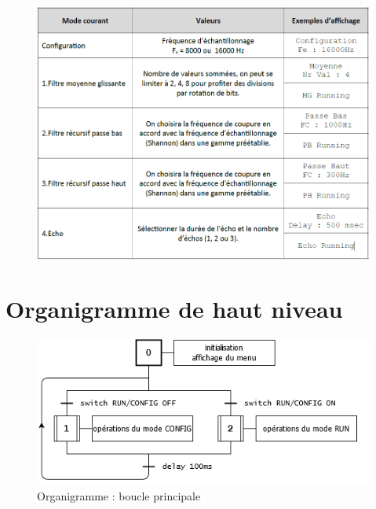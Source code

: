 \documentclass{article}
\begin{document}
    \begin{figure}[H]
        \centering
        \includegraphics[width=.7\textwidth]{./images/menus.png}
    \end{figure}









    \newpage
    \section{Organigramme de haut niveau}
    \begin{figure}[H]
        \centering
        \includegraphics[width=.5\textwidth]{./images/orga_global.png}
        \caption{Organigramme : boucle principale}
    \end{figure}
\end{document}
